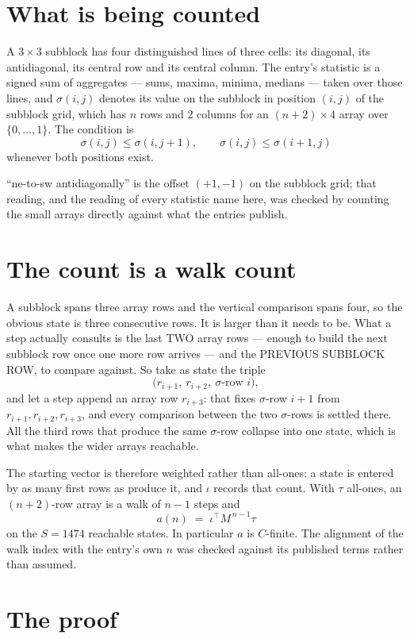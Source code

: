 \documentclass[11pt,a4paper]{article}
\theoremstyle{plain}
\theoremstyle{definition}
\begin{document}
\section{What is being counted}

A $3\times3$ subblock has four distinguished lines of three cells: its diagonal, its
antidiagonal, its central row and its central column. The entry's statistic is a signed sum of
aggregates --- sums, maxima, minima, medians --- taken over those lines, and $\sigma(i,j)$
denotes its value on the subblock in position $(i,j)$ of the subblock grid, which has $n$ rows
and $2$ columns for an $(n+2)\times4$ array over $\{0,\dots,1\}$. The condition is
\[
\sigma(i,j)\le\sigma(i,j+1),\qquad \sigma(i,j)\le\sigma(i+1,j)
\]
whenever both positions exist.

``ne-to-sw antidiagonally'' is the offset $(+1,-1)$ on the subblock grid; that reading, and
the reading of every statistic name here, was checked by counting the small arrays directly
against what the entries publish.

\section{The count is a walk count}

A subblock spans three array rows and the vertical comparison spans four, so the obvious state
is three consecutive rows. It is larger than it needs to be. What a step actually consults is
the last TWO array rows --- enough to build the next subblock row once one more row arrives ---
and the PREVIOUS SUBBLOCK ROW, to compare against. So take as state the triple
\[
\bigl(r_{i+1},\ r_{i+2},\ \sigma\text{-row }i\bigr),
\]
and let a step append an array row $r_{i+3}$: that fixes $\sigma$-row $i+1$ from
$r_{i+1},r_{i+2},r_{i+3}$, and every comparison between the two $\sigma$-rows is settled
there. All the third rows that produce the same $\sigma$-row collapse into one state, which is
what makes the wider arrays reachable.

The starting vector is therefore weighted rather than all-ones: a state is entered by as many
first rows as produce it, and $\iota$ records that count. With $\tau$ all-ones, an
$(n+2)$-row array is a walk of $n-1$ steps and
\[
a(n)\;=\;\iota^{\!\top}M^{\,n-1}\tau
\]
on the $S=1474$ reachable states. In particular $a$ is $C$-finite. The alignment of the walk
index with the entry's own $n$ was checked against its published terms rather than assumed.

\section{The proof}
\end{document}
